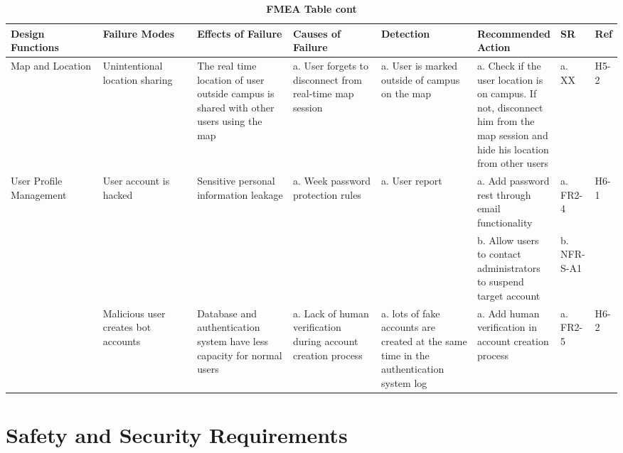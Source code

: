 \documentclass{article}
\begin{document}
\begin{table}[H]
    \begin{adjustbox}{width=(/5)}
    \centering
    

    \begin{tabular}{|p{0.20\linewidth} | p{0.20\linewidth} | p{0.20\linewidth}|  p{0.20\linewidth}|  p{0.21\linewidth}|  p{0.30\linewidth}|  p{0.08\linewidth}|p{0.07\linewidth}| }
    \hline
         \textbf{Design Functions} & \textbf{Failure Modes} & \textbf{Effects of Failure} & \textbf{Causes of Failure} &\textbf{Detection}& \textbf{Recommended Action} & \textbf{SR} & \textbf{Ref}\\
         \hline
         Map and Location     &     Unintentional location sharing      &      The real time location of user outside campus is shared with other users using the map      &      a. User forgets to disconnect from real-time map session      &      a. User is marked outside of campus on the map     &      a. Check if the user location is on campus. If not, disconnect him from the map session and hide his location from other users      &      a. XX      &      H5-2      \\
         \hline
         User Profile Management     &    User account is hacked      &      Sensitive personal information leakage      &      a. Week password protection rules      &      a. User report      &      a. Add password rest through email functionality      &      a. FR2-4      &      H6-1      \\
         &&&&&      b. Allow users to contact administrators to suspend target account      &      b. NFR-S-A1      & \\
         &      Malicious user creates bot accounts      &       Database and authentication system have less capacity for normal users    &      a. Lack of human verification during account creation process      &      a. lots of fake accounts are created at the same time in the authentication system log      &      a. Add human verification in account creation process    &      a. FR2-5      &      H6-2     \\
          \hline
    \end{tabular}
    \end{adjustbox}
    \caption{\bf FMEA Table cont}
    \label{tab:FMEA2}
\end{table}

\section{Safety and Security Requirements}
\end{document}
